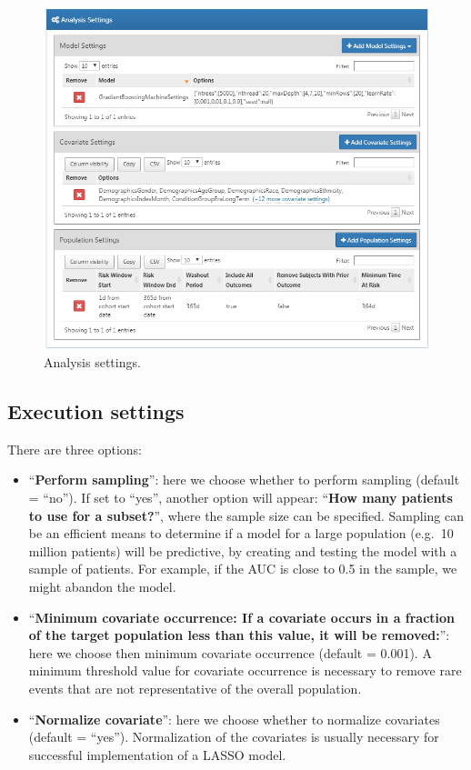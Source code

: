 \documentclass[11pt]{book}
\providecommand{\tightlist}{%
  \setlength{\itemsep}{0pt}\setlength{\parskip}{0pt}}
\theoremstyle{definition}
\theoremstyle{definition}
\theoremstyle{definition}
\theoremstyle{remark}
\begin{document}
\begin{figure}

{\centering \includegraphics[width=1\linewidth]{images/PatientLevelPrediction/analysisSettings} 

}

\caption{Analysis settings.}\label{fig:analysisSettings}
\end{figure}

\hypertarget{execution-settings}{%
\subsection{Execution settings}\label{execution-settings}}

There are three options:

\begin{itemize}
\tightlist
\item
  ``\textbf{Perform sampling}'': here we choose whether to perform sampling (default = ``no''). If set to ``yes'', another option will appear: ``\textbf{How many patients to use for a subset?}'', where the sample size can be specified. Sampling can be an efficient means to determine if a model for a large population (e.g.~10 million patients) will be predictive, by creating and testing the model with a sample of patients. For example, if the AUC is close to 0.5 in the sample, we might abandon the model.
\item
  ``\textbf{Minimum covariate occurrence: If a covariate occurs in a fraction of the target population less than this value, it will be removed:}'': here we choose then minimum covariate occurrence (default = 0.001). A minimum threshold value for covariate occurrence is necessary to remove rare events that are not representative of the overall population.
\item
  ``\textbf{Normalize covariate}'': here we choose whether to normalize covariates (default = ``yes''). Normalization of the covariates is usually necessary for successful implementation of a LASSO model.
\end{itemize}
\end{document}
